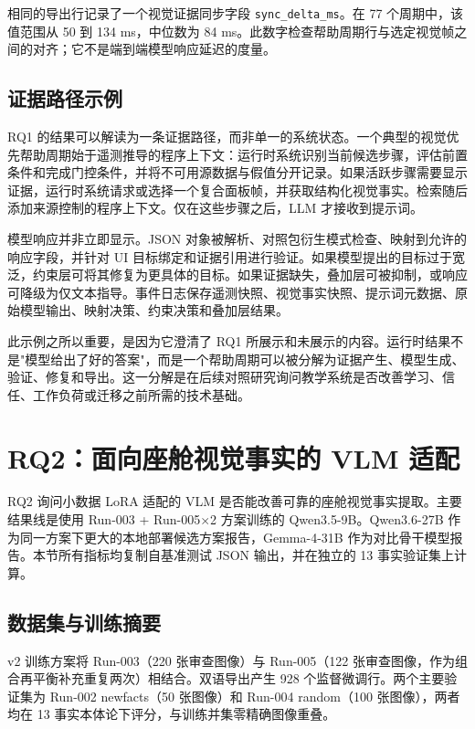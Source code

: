 相同的导出行记录了一个视觉证据同步字段 \texttt{sync\_delta\_ms}。在 77 个周期中，该值范围从 50 到 134 ms，中位数为 84 ms。此数字检查帮助周期行与选定视觉帧之间的对齐；它不是端到端模型响应延迟的度量。

\subsection{证据路径示例}

RQ1 的结果可以解读为一条证据路径，而非单一的系统状态。一个典型的视觉优先帮助周期始于遥测推导的程序上下文：运行时系统识别当前候选步骤，评估前置条件和完成门控条件，并将不可用源数据与假值分开记录。如果活跃步骤需要显示证据，运行时系统请求或选择一个复合面板帧，并获取结构化视觉事实。检索随后添加来源控制的程序上下文。仅在这些步骤之后，LLM 才接收到提示词。

模型响应并非立即显示。JSON 对象被解析、对照包衍生模式检查、映射到允许的响应字段，并针对 UI 目标绑定和证据引用进行验证。如果模型提出的目标过于宽泛，约束层可将其修复为更具体的目标。如果证据缺失，叠加层可被抑制，或响应可降级为仅文本指导。事件日志保存遥测快照、视觉事实快照、提示词元数据、原始模型输出、映射决策、约束决策和叠加层结果。

此示例之所以重要，是因为它澄清了 RQ1 所展示和未展示的内容。运行时结果不是"模型给出了好的答案"，而是一个帮助周期可以被分解为证据产生、模型生成、验证、修复和导出。这一分解是在后续对照研究询问教学系统是否改善学习、信任、工作负荷或迁移之前所需的技术基础。

\section{RQ2：面向座舱视觉事实的 VLM 适配}\label{sec:eval-rq2}

RQ2 询问小数据 LoRA 适配的 VLM 是否能改善可靠的座舱视觉事实提取。主要结果线是使用 Run-003 + Run-005$\times$2 方案训练的 Qwen3.5-9B。Qwen3.6-27B 作为同一方案下更大的本地部署候选方案报告，Gemma-4-31B 作为对比骨干模型报告。本节所有指标均复制自基准测试 JSON 输出，并在独立的 13 事实验证集上计算。

\subsection{数据集与训练摘要}

v2 训练方案将 Run-003（220 张审查图像）与 Run-005（122 张审查图像，作为组合再平衡补充重复两次）相结合。双语导出产生 928 个监督微调行。两个主要验证集为 Run-002 newfacts（50 张图像）和 Run-004 random（100 张图像），两者均在 13 事实本体论下评分，与训练并集零精确图像重叠。

